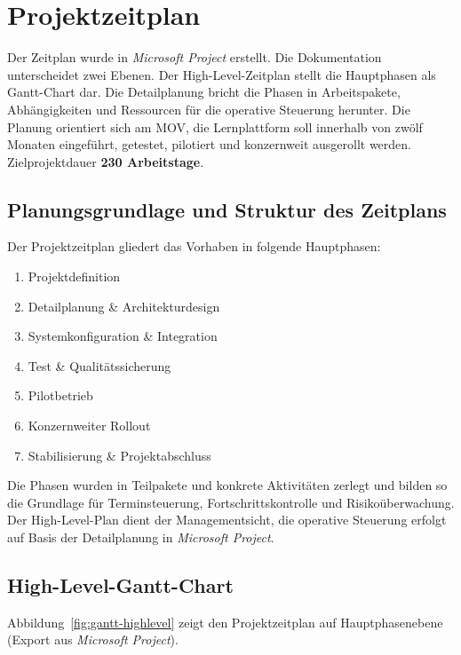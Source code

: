 
\chapter{Projektzeitplan}

Der Zeitplan wurde in \textit{Microsoft Project} erstellt. Die Dokumentation
unterscheidet zwei Ebenen. Der High-Level-Zeitplan stellt die Hauptphasen als
Gantt-Chart dar. Die Detailplanung bricht die Phasen in Arbeitspakete,
Abhängigkeiten und Ressourcen für die operative Steuerung herunter. Die
Planung orientiert sich am \ac{MOV}, die Lernplattform soll innerhalb von
zwölf Monaten eingeführt, getestet, pilotiert und konzernweit ausgerollt werden.
Zielprojektdauer \textbf{230 Arbeitstage}.

\section{Planungsgrundlage und Struktur des Zeitplans}

Der Projektzeitplan gliedert das Vorhaben in folgende Hauptphasen:

\begin{enumerate}
    \item Projektdefinition
    \item Detailplanung \& Architekturdesign
    \item Systemkonfiguration \& Integration
    \item Test \& Qualitätssicherung
    \item Pilotbetrieb
    \item Konzernweiter Rollout
    \item Stabilisierung \& Projektabschluss
\end{enumerate}

Die Phasen wurden in Teilpakete und konkrete Aktivitäten zerlegt und bilden so
die Grundlage für Terminsteuerung, Fortschrittskontrolle und Risikoüberwachung.
Der High-Level-Plan dient der Managementsicht, die operative Steuerung erfolgt
auf Basis der Detailplanung in \textit{Microsoft Project}.

\section{High-Level-Gantt-Chart}

Abbildung~\ref{fig:gantt-highlevel} zeigt den Projektzeitplan auf
Hauptphasenebene (Export aus \textit{Microsoft Project}).

